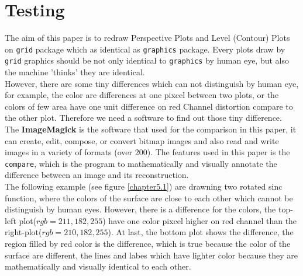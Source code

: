 \documentclass[paper=a4, fontsize=11pt]{report}
\begin{document}
\chapter{Testing}
The aim of this paper is to redraw Perspective Plots and Level (Contour) Plots on \texttt{grid} package which as identical as \texttt{graphics} package. Every plots draw by \texttt{grid} graphics should be not only identical to \texttt{graphics} by human eye, but also the machine 'thinks' they are identical.\\

However, there are some tiny differences which can not distinguish by human eye, for example, the color are differences at one pixcel between two plots, or the colors of few area have one unit difference on red Channel distortion compare to the other plot. Therefore we need a software to find out those tiny difference.\\

The \textbf{ImageMagick} is the software that used for the comparison in this paper, it can create, edit, compose, or convert bitmap images and also read and write images in a variety of formats (over 200). The features used in this paper is the \texttt{compare}, which is the program to mathematically and visually annotate the difference between an image and its reconstruction.\\

The following example (see figure \ref{chapter5.1}) are drawning two rotated sinc function, where the colors of the surface are close to each other which cannot be distinguish by human eyes. However, there is a difference for the colors, the top-left plot($rgb = 211, 182, 255$) have one color pixcel higher on red channel than the right-plot($rgb = 210, 182, 255$). At last, the bottom plot shows the difference, the region filled by red color is the difference, which is true because the color of the surface are different, the lines and labes which have lighter color because they are mathematically and visually identical to each other. \\
\end{document}
